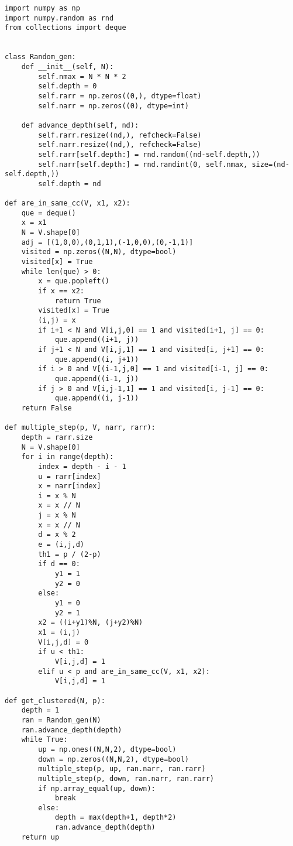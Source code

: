 \documentclass[]{marticle}
\begin{document}
\begin{lstlisting}
import numpy as np
import numpy.random as rnd
from collections import deque


class Random_gen:
    def __init__(self, N):
        self.nmax = N * N * 2
        self.depth = 0
        self.rarr = np.zeros((0,), dtype=float)
        self.narr = np.zeros((0), dtype=int)

    def advance_depth(self, nd):
        self.rarr.resize((nd,), refcheck=False)
        self.narr.resize((nd,), refcheck=False)
        self.rarr[self.depth:] = rnd.random((nd-self.depth,))
        self.narr[self.depth:] = rnd.randint(0, self.nmax, size=(nd-self.depth,))
        self.depth = nd

def are_in_same_cc(V, x1, x2):
    que = deque()
    x = x1
    N = V.shape[0]
    adj = [(1,0,0),(0,1,1),(-1,0,0),(0,-1,1)]
    visited = np.zeros((N,N), dtype=bool)
    visited[x] = True
    while len(que) > 0:
        x = que.popleft()
        if x == x2:
            return True
        visited[x] = True
        (i,j) = x
        if i+1 < N and V[i,j,0] == 1 and visited[i+1, j] == 0:
            que.append((i+1, j))
        if j+1 < N and V[i,j,1] == 1 and visited[i, j+1] == 0:
            que.append((i, j+1))
        if i > 0 and V[(i-1,j,0] == 1 and visited[i-1, j] == 0:
            que.append((i-1, j))
        if j > 0 and V[i,j-1,1] == 1 and visited[i, j-1] == 0:
            que.append((i, j-1))
    return False

def multiple_step(p, V, narr, rarr):
    depth = rarr.size
    N = V.shape[0]
    for i in range(depth):
        index = depth - i - 1
        u = rarr[index]
        x = narr[index]
        i = x % N
        x = x // N
        j = x % N
        x = x // N
        d = x % 2
        e = (i,j,d)
        th1 = p / (2-p)
        if d == 0:
            y1 = 1
            y2 = 0
        else:
            y1 = 0
            y2 = 1
        x2 = ((i+y1)%N, (j+y2)%N)
        x1 = (i,j)
        V[i,j,d] = 0
        if u < th1:
            V[i,j,d] = 1
        elif u < p and are_in_same_cc(V, x1, x2):
            V[i,j,d] = 1

def get_clustered(N, p):
    depth = 1
    ran = Random_gen(N)
    ran.advance_depth(depth)
    while True:
        up = np.ones((N,N,2), dtype=bool)
        down = np.zeros((N,N,2), dtype=bool)
        multiple_step(p, up, ran.narr, ran.rarr)
        multiple_step(p, down, ran.narr, ran.rarr)
        if np.array_equal(up, down):
            break
        else:
            depth = max(depth+1, depth*2)
            ran.advance_depth(depth)
    return up


\end{lstlisting}
\end{document}
